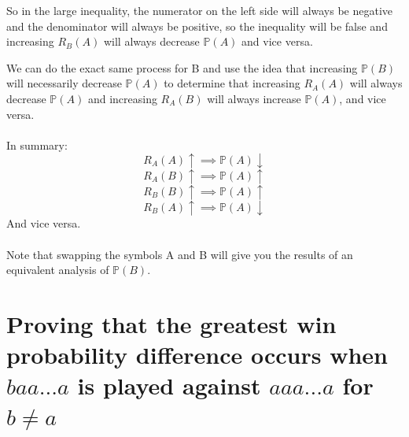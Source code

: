 \documentclass[english,12pt,a4paper,final]{article}
\begin{document}
So in the large inequality, the numerator on the left side will always be negative and the denominator will always be positive, so the inequality will be false and increasing $R_B(A)$ will always decrease $\mathbb{P}(A)$ and vice versa.

We can do the exact same process for B and use the idea that increasing $\mathbb{P}(B)$ will necessarily decrease $\mathbb{P}(A)$ to determine that increasing $R_A(A)$ will always decrease $\mathbb{P}(A)$ and increasing $R_A(B)$ will always increase $\mathbb{P}(A)$, and vice versa.
\\\\
In summary:
\begin{equation}\label{R_A(A)change}
	R_A(A)\uparrow \implies \mathbb{P}(A)\downarrow
\end{equation}
\begin{equation}\label{R_A(B)change}
	R_A(B)\uparrow \implies \mathbb{P}(A)\uparrow
\end{equation}
\begin{equation}\label{R_B(B)change}
	R_B(B)\uparrow \implies \mathbb{P}(A)\uparrow
\end{equation}
\begin{equation}\label{R_B(A)change}
	R_B(A)\uparrow \implies \mathbb{P}(A)\downarrow
\end{equation}
And vice versa.
\\\\

Note that swapping the symbols A and B will give you the results of an equivalent analysis of $\mathbb{P}(B)$.

\section{Proving that the greatest win probability difference occurs when $baa...a$ is played against $aaa...a$ for $b\ne a$}
\end{document}
